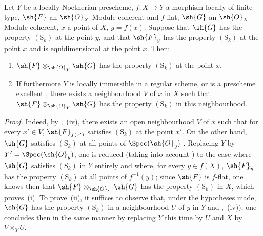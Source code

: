\begin{corollary}[12.1.5]
\label{IV.12.1.5}
Let $Y$ be a locally Noetherian prescheme, $f:X\to Y$ a morphism locally of finite type, $\sh{F}$ an $\sh{O}_X$-Module coherent and $f$-flat, $\sh{G}$ an $\sh{O}_X$-Module coherent, $x$ a point of $X$, $y=f(x)$.
Suppose that $\sh{G}$ has the property $(\mathrm{S}_k)$ at the point $y$, and that $\sh{F}_y$ has the property $(\mathrm{S}_k)$ at the point $x$ and is equidimensional at the point $x$.
Then:
\begin{enumerate}[label=(\roman*)]
  \item $\sh{F}\otimes_{\sh{O}_Y}\sh{G}$ has the property $(\mathrm{S}_k)$ at the point $x$.
  \item If furthermore $Y$ is locally immersible in a regular scheme, or is a prescheme excellent , there exists a neighbourhood $V$ of $x$ in $X$ such that $\sh{F}\otimes_{\sh{O}_Y}\sh{G}$ has the property $(\mathrm{S}_k)$ in this neighbourhood.
\end{enumerate}
\end{corollary}

\begin{proof}
Indeed, by ,~(iv), there exists an open neighbourhood $V$ of $x$ such that for every $x'\in V$, $\sh{F}_{f(x')}$ satisfies $(\mathrm{S}_k)$ at the point $x'$.
On the other hand, $\sh{G}$ satisfies $(\mathrm{S}_k)$ at all points of $\Spec(\sh{O}_y)$ .
Replacing $Y$ by $Y'=\Spec(\sh{O}_y)$, one is reduced (taking into account ) to the case where $\sh{G}$ satisfies $(\mathrm{S}_k)$ in $Y$ entirely and where, for every $y\in f(X)$, $\sh{F}_y$ has the property $(\mathrm{S}_k)$ at all points of $f^{-1}(y)$; since $\sh{F}$ is $f$-flat, one knows then  that $\sh{F}\otimes_{\sh{O}_Y}\sh{G}$ has the property $(\mathrm{S}_k)$ in $X$, which proves~(i).
To prove~(ii), it suffices to observe that, under the hypotheses made, $\sh{G}$ has the
property $(\mathrm{S}_k)$ in a neighbourhood $U$ of $y$ in $Y$  and ,~(iv)); one concludes then in the same manner by replacing $Y$ this time by $U$ and $X$ by $V\times_Y U$.
\end{proof}

